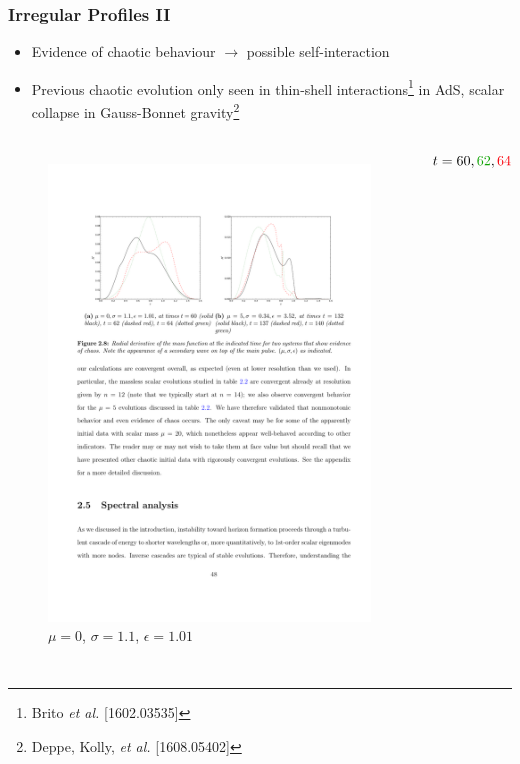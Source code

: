 \documentclass[mathserif,10pt]{beamer}
\newcommand{\bi}{\begin{itemize}}
\newcommand{\ei}{\end{itemize}}
\newcommand{\its}{\item}
\newcommand{\scr}{\scriptsize}
\begin{document}
{\frame
{
  \frametitle{Irregular Profiles II}
  \bi
  \its Evidence of chaotic behaviour $\to$ possible self-interaction
  \its Previous chaotic evolution only seen in thin-shell interactions\footnote<1->{{\scr Brito {\it et al.} [1602.03535]}} in AdS, scalar collapse in Gauss-Bonnet gravity\footnote<1->{{\scr Deppe, Kolly, {\it et al.} [1608.05402]}}
  \ei
  \vspace{-0.15in}
  \begin{columns}
      \begin{figure}
  	\centering
	\includegraphics[scale=0.75]{selfinteraction} \\ $\mu = 0$, $\sigma=1.1$, $\epsilon = 1.01$
       \end{figure}
    \hspace{-0.6in}
       $t = 60, {\color[rgb]{0.06,0.64,0.01} 62}, {\color[rgb]{.98,0,0.04} 64}$
   \end{columns}

}}
\end{document}
